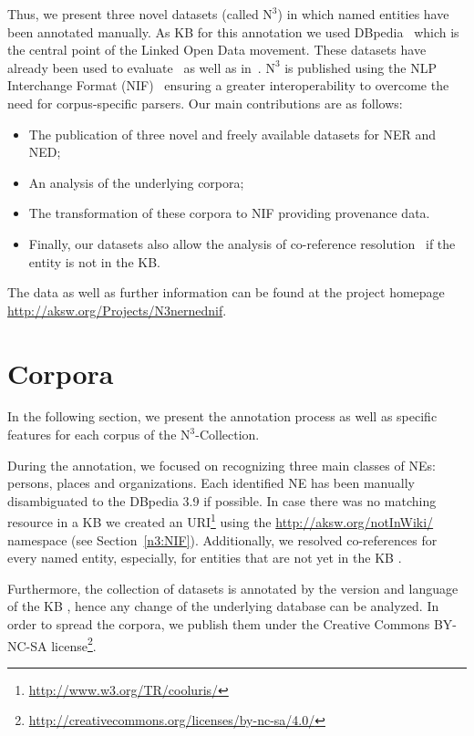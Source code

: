 Thus, we present three novel datasets (called $\mbox{N}^3$) in which named entities have been annotated manually. As \ac{KB}  for this annotation we used DBpedia~\cite{dbpedia-swj} which is the central point of the Linked Open Data movement. These datasets have already been used to evaluate~\cite{AIDA,spotlight} as well as in~\cite{GER+13,agdistis_iswc,GERBIL}.
$\mbox{N}^3$ is published using the \ac{NLP} Interchange Format (NIF)~\cite{ISWC2013NIF} ensuring a greater interoperability to overcome the need for corpus-specific parsers. 
Our main contributions are as follows:
\begin{itemize}
\item The publication of three novel and freely available datasets for \ac{NER} and \ac{NED};
\item An analysis of the underlying corpora;
\item The transformation of these corpora to NIF providing provenance data.
\item Finally, our datasets also allow the analysis of co-reference resolution~\cite{NgongaNgomo2014,singh} if the entity is not in the \ac{KB}.
\end{itemize}
The data as well as further information can be found at the project homepage \url{http://aksw.org/Projects/N3nernednif}.


\section{Corpora}
\label{n3:sec:Features}




In the following section, we present the annotation process as well as specific features for each corpus of the $\mbox{N}^3$-Collection.

During the annotation, we focused on recognizing three main classes of NEs: persons, places and organizations. 
Each identified NE has been manually disambiguated to the DBpedia 3.9  if possible.
In case there was no matching resource in a \ac{KB}  we created an URI\footnote{\url{http://www.w3.org/TR/cooluris/}} using the \url{http://aksw.org/notInWiki/} namespace (see Section~\ref{n3:NIF}).
Additionally, we resolved co-references for every named entity, especially, for entities that are not yet in the \ac{KB} . %

Furthermore, the collection of datasets is annotated by the version and language of the \ac{KB} , hence any change of the underlying database can be analyzed.
In order to spread the corpora, we publish them under the Creative Commons BY-NC-SA license\footnote{\url{http://creativecommons.org/licenses/by-nc-sa/4.0/}}.


